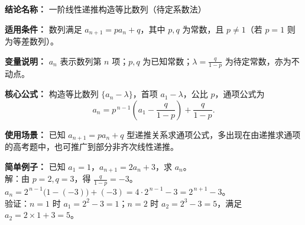 \textbf{结论名称：} 一阶线性递推构造等比数列（待定系数法）

\textbf{适用条件：} 数列满足 \( a_{n+1} = p a_n + q \)，其中 \( p,q \) 为常数，且 \( p \neq 1 \)（若 \( p=1 \) 则为等差数列）。

\textbf{变量说明：} \( a_n \) 表示数列第 \( n \) 项；\( p,q \) 为已知常数；\( \lambda = \frac{q}{1-p} \) 为待定常数，亦为不动点。

\textbf{核心公式：} 
构造等比数列 \(\{a_n - \lambda\}\)，首项 \( a_1 - \lambda \)，公比 \( p \)，通项公式为
\[
\boxed{ a_n = p^{\,n-1}\left( a_1 - \frac{q}{1-p} \right) + \frac{q}{1-p} }.
\]

\textbf{使用场景：} 已知 \( a_{n+1} = p a_n + q \) 型递推关系求通项公式，多出现在由递推求通项的高考题中，也可推广到部分非齐次线性递推。

\textbf{简单例子：} 
已知 \( a_1 = 1 \)，\( a_{n+1} = 2a_n + 3 \)，求 \( a_n \)。\\
解：由 \( p=2,q=3 \)，得 \( \frac{q}{1-p} = -3 \)。\\
\( a_n = 2^{\,n-1}\bigl(1 - (-3)\bigr) + (-3) = 4 \cdot 2^{\,n-1} - 3 = 2^{\,n+1} - 3 \)。\\
验证：\( n=1 \) 时 \( a_1 = 2^2 - 3 = 1 \)；\( n=2 \) 时 \( a_2 = 2^3 - 3 = 5 \)，满足 \( a_2 = 2\times 1 + 3 = 5 \)。